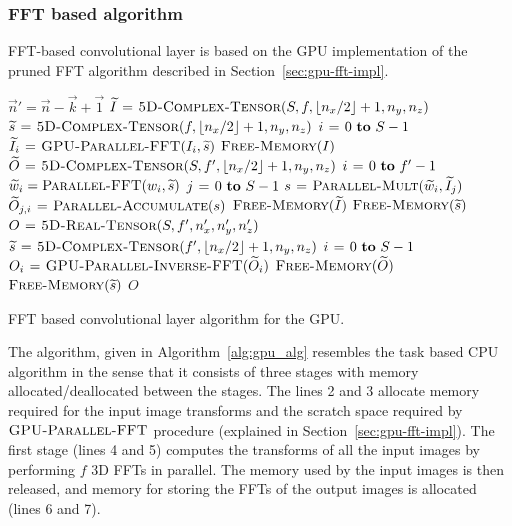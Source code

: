 \documentclass[conference]{./IEEEtran}
\DeclarePairedDelimiter{\floor}{\lfloor}{\rfloor}
\begin{document}
\subsubsection{FFT based algorithm}

  FFT-based convolutional layer is based on the GPU implementation of
  the pruned FFT algorithm described in
  Section~\ref{sec:gpu-fft-impl}.

  \begin{algorithm}
    {\footnotesize
    \begin{codebox}
      \li $\vec{n}' = \vec{n} - \vec{k} + \vec{1}$
      \li $\widetilde{I} \gets \proc{5D-Complex-Tensor}(S,f,\floor{n_x/2}+1,n_y,n_z)$
      \li $\widetilde{s} \gets \proc{5D-Complex-Tensor}(f,\floor{n_x/2}+1,n_y,n_z)$
      \li \For $i \gets 0 \To S-1$
      \li   \Do $\widetilde{I}_{i} \mathrel{\hspace{1pt}=\hspace{1pt}} \textnormal{\scshape GPU-Parallel-FFT}(I_{i},\widetilde{s})$
      \End
      \li $\textnormal{\scshape Free-Memory}(I)$
      \li $\widetilde{O} \gets \proc{5D-Complex-Tensor}(S,f',\floor{n_x/2}+1,n_y,n_z)$
      \li \For $i \gets 0 \To f'-1$
      \li    \Do $\widetilde{w}_{i} = \textnormal{\scshape Parallel-FFT}(w_{i},\widetilde{s})$
      \li        \For $j \gets 0 \To S-1$
      \li           \Do $s \mathrel{\hspace{1pt}=\hspace{1pt}} \textnormal{\scshape Parallel-Mult}(\widetilde{w}_{i}, \widetilde{I}_{j})$
      \li               $\widetilde{O}_{j,i} \mathrel{\hspace{1pt}=\hspace{1pt}} \textnormal{\scshape Parallel-Accumulate}(s)$
      \End \End
      \li $\textnormal{\scshape Free-Memory}(\widetilde{I})$
      \li $\textnormal{\scshape Free-Memory}(\widetilde{s})$
      \li $O \mathrel{\hspace{1pt}=\hspace{1pt}} \textnormal{\scshape5D-Real-Tensor}(S,f',n'_x,n'_y,n'_z)$
      \li $\widetilde{s} \gets \proc{5D-Complex-Tensor}(f',\floor{n_x/2}+1,n_y,n_z)$
      \li \For $i \gets 0 \To S-1$
      \li   \Do $O_{i} \mathrel{\hspace{1pt}=\hspace{1pt}} \textnormal{\scshape GPU-Parallel-Inverse-FFT}(\widetilde{O}_{i})$
      \End
      \li $\textnormal{\scshape Free-Memory}(\widetilde{O})$
      \li $\textnormal{\scshape Free-Memory}(\widetilde{s})$
      \li \Return $O$
    \end{codebox}
    }

    \caption{FFT based convolutional layer algorithm for the GPU.}
    \label{alg:gpu_alg}
  \end{algorithm}

  The algorithm, given in Algorithm~\ref{alg:gpu_alg} resembles the
  task based CPU algorithm in the sense that it consists of three
  stages with memory allocated/deallocated between the stages.  The
  lines 2 and 3 allocate memory required for the input image
  transforms and the scratch space required by
  $\textnormal{\scshape GPU-Parallel-FFT}$ procedure (explained in
  Section~\ref{sec:gpu-fft-impl}).  The first stage (lines 4 and 5)
  computes the transforms of all the input images by performing $f$ 3D
  FFTs in parallel.  The memory used by the input images is then
  released, and memory for storing the FFTs of the output images is
  allocated (lines 6 and 7).
\end{document}
